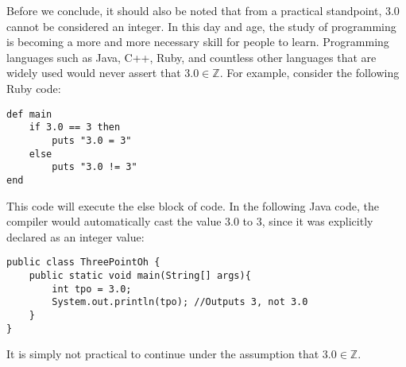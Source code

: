\documentclass{article}
\newcommand{\ZZ}{\mathbb{Z}}
\begin{document}
Before we conclude, it should also be noted that from a practical standpoint, 3.0 cannot be considered
an integer. In this day and age, the study of programming is becoming a more and more necessary
skill for people to learn. Programming languages such as Java, C++, Ruby, and countless other
languages that are widely used would never assert that $3.0\in\ZZ$. For example, consider the following
Ruby code:
\begin{verbatim}
def main
    if 3.0 == 3 then
        puts "3.0 = 3"
    else
        puts "3.0 != 3"
end
\end{verbatim}
This code will execute the else block of code. In the following Java code, the compiler would
automatically cast the value 3.0 to 3, since it was explicitly declared as an integer value:
\begin{verbatim}
public class ThreePointOh {
    public static void main(String[] args){
        int tpo = 3.0;
        System.out.println(tpo); //Outputs 3, not 3.0
    }
}
\end{verbatim}
It is simply not practical to continue under the assumption that $3.0\in\ZZ$.
\end{document}
